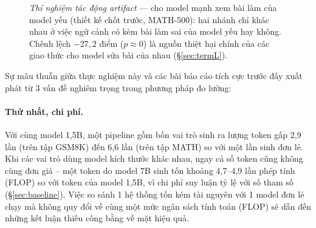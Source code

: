 \documentclass[11pt,a4paper]{article}
\begin{document}
\begin{figure}[!ht]\centering
{}
\caption{\emph{Thí nghiệm tác động artifact} --- cho model mạnh xem bài làm của model yếu
(thiết kế chốt trước, MATH-500): hai nhánh chỉ khác nhau ở việc ngữ cảnh
có kèm bài làm sai của model yếu hay không. Chênh lệch $-27{,}2$ điểm ($p \approx 0$) là nguồn
thiệt hại chính của các giao thức cho model sửa bài của nhau (\S\ref{sec:termL}).}
\label{fig:exposure}
\end{figure}

Sự mâu thuẫn giữa thực nghiệm này và các bài báo cáo tích cực trước đấy xuất phát từ 3 vấn đề nghiêm trọng trong phương pháp đo lường:

\paragraph{Thứ nhất, chi phí.} Với cùng model 1,5B, một pipeline gồm bốn vai trò sinh ra lượng token gấp 2,9 lần (trên tập GSM8K) đến
6,6 lần (trên tập MATH) so với một lần sinh đơn lẻ. Khi các vai trò dùng model kích thước khác nhau, ngay cả số token cũng
không cùng đơn giá -- một token do model 7B sinh tốn khoảng 4,7--4,9 lần phép tính (FLOP) so
với token của model 1,5B, vì chi phí suy luận tỷ lệ với số tham số \cite{kaplan2020}
(\S\ref{sec:baseline}). Việc so sánh 1 hệ thống tốn kém tài nguyên với 1 model đơn lẻ chạy mà không quy đổi về cùng một mức ngân sách tính toán (FLOP) sẽ dẫn đến những kết luận thiếu công bằng về mặt hiệu quả.
\end{document}
